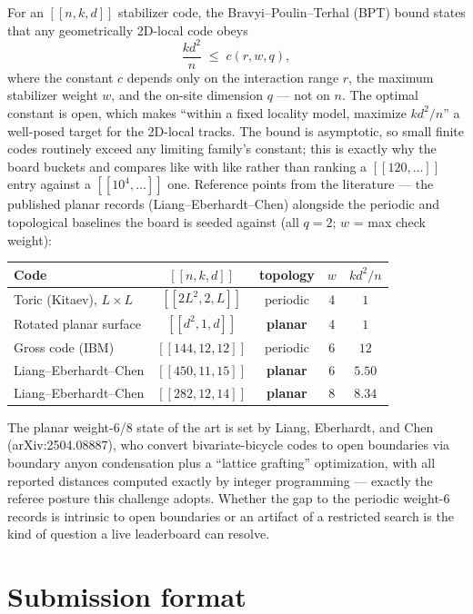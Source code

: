 \documentclass[11pt]{article}
\newcommand{\eff}{kd^2/n}
\begin{document}
	For an $[[n,k,d]]$ stabilizer code, the Bravyi--Poulin--Terhal (BPT) bound
	states that any geometrically 2D-local code obeys
	\begin{equation}
		\frac{kd^2}{n} \;\le\; c(r,w,q),
		\label{eq:bpt}
	\end{equation}
	where the constant $c$ depends only on the interaction range $r$, the
	maximum stabilizer weight $w$, and the on-site dimension $q$ --- not on $n$.
	The optimal constant is open, which makes ``within a fixed locality model,
	maximize $\eff$'' a well-posed target for the 2D-local tracks. The bound is
	asymptotic, so small finite codes routinely exceed any limiting family's
	constant; this is exactly why the board buckets and compares like with like
	rather than ranking a $[[120,\dots]]$ entry against a $[[10^4,\dots]]$ one.
	Reference points from the literature --- the published planar records
	(Liang--Eberhardt--Chen) alongside the periodic and topological baselines
	the board is seeded against (all $q=2$; $w$ = max check weight):
	\begin{center}
		\begin{tabular}{lcccc}
			\toprule
			Code & $[[n,k,d]]$ & topology & $w$ & $\eff$\\
			\midrule
			Toric (Kitaev), $L\times L$  & $[[2L^2,2,L]]$  & periodic & 4 & $1$\\
			Rotated planar surface       & $[[d^2,1,d]]$   & \textbf{planar} & 4 & $1$\\
			Gross code (IBM)             & $[[144,12,12]]$ & periodic & 6 & $12$\\
			Liang--Eberhardt--Chen       & $[[450,11,15]]$ & \textbf{planar} & 6 & $5.50$\\
			Liang--Eberhardt--Chen       & $[[282,12,14]]$ & \textbf{planar} & 8 & $8.34$\\
			\bottomrule
		\end{tabular}
	\end{center}
	The planar weight-6/8 state of the art is set by Liang, Eberhardt, and Chen
	(arXiv:2504.08887), who convert bivariate-bicycle codes to open boundaries
	via boundary anyon condensation plus a ``lattice grafting'' optimization,
	with all reported distances computed exactly by integer programming ---
	exactly the referee posture this challenge adopts. Whether the gap to the
	periodic weight-6 records is intrinsic to open boundaries or an artifact of
	a restricted search is the kind of question a live leaderboard can resolve.

	\section{Submission format}
\end{document}
